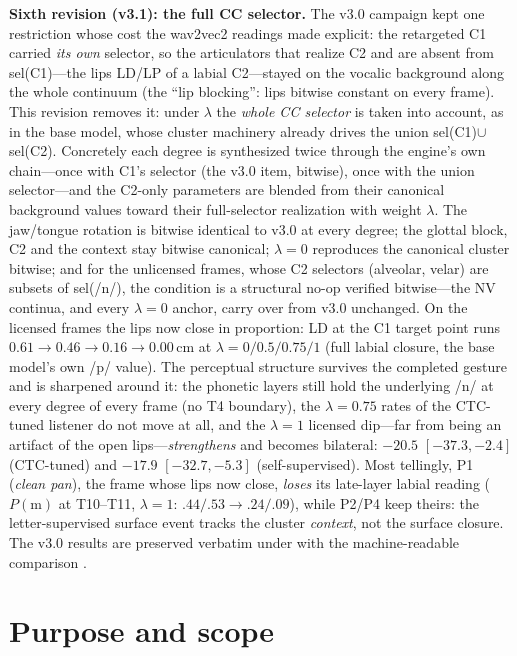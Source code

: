 \documentclass[11pt,a4paper]{article}
\newcommand{\lam}{\lambda}
\begin{document}
\medskip\noindent
\textbf{Sixth revision (v3.1): the full CC selector.} The v3.0
campaign kept one restriction whose cost the wav2vec2 readings made
explicit: the retargeted C1 carried \emph{its own} selector, so the
articulators that realize C2 and are absent from sel(C1)---the lips
LD/LP of a labial C2---stayed on the vocalic background along the
whole continuum (the ``lip blocking'': lips bitwise constant on
every frame). This revision removes it: under $\lam$ the \emph{whole
CC selector} is taken into account, as in the base model, whose
cluster machinery already drives the union sel(C1)$\cup$sel(C2).
Concretely each degree is synthesized twice through the engine's own
chain---once with C1's selector (the v3.0 item, bitwise), once with
the union selector---and the C2-only parameters are blended from
their canonical background values toward their full-selector
realization with weight $\lam$. The jaw/tongue rotation is bitwise
identical to v3.0 at every degree; the glottal block, C2 and the
context stay bitwise canonical; $\lam=0$ reproduces the canonical
cluster bitwise; and for the unlicensed frames, whose C2 selectors
(alveolar, velar) are subsets of sel(/n/), the condition is a
structural no-op verified bitwise---the NV continua, and every
$\lam=0$ anchor, carry over from v3.0 unchanged. On the licensed
frames the lips now close in proportion: LD at the C1 target point
runs $0.61 \rightarrow 0.46 \rightarrow 0.16 \rightarrow 0.00$\,cm
at $\lam = 0/0.5/0.75/1$ (full labial closure, the base model's own
/p/ value). The perceptual structure survives the completed gesture
and is sharpened around it: the phonetic layers still hold the
underlying /n/ at every degree of every frame (no T4 boundary), the
$\lam=0.75$ rates of the CTC-tuned listener do not move at all, and
the $\lam=1$ licensed dip---far from being an artifact of the open
lips---\emph{strengthens} and becomes bilateral: $-20.5$
$[-37.3, -2.4]$ (CTC-tuned) and $-17.9$ $[-32.7, -5.3]$
(self-supervised). Most tellingly, P1 (\emph{clean pan}), the frame
whose lips now close, \emph{loses} its late-layer labial reading
($P(\mathrm{m})$ at T10--T11, $\lam=1$: $.44/.53 \rightarrow
.24/.09$), while P2/P4 keep theirs: the letter-supervised surface
event tracks the cluster \emph{context}, not the surface closure.
The v3.0 results are preserved verbatim under
 with the machine-readable comparison
.

\section{Purpose and scope}
\label{sec:purpose}
\end{document}
